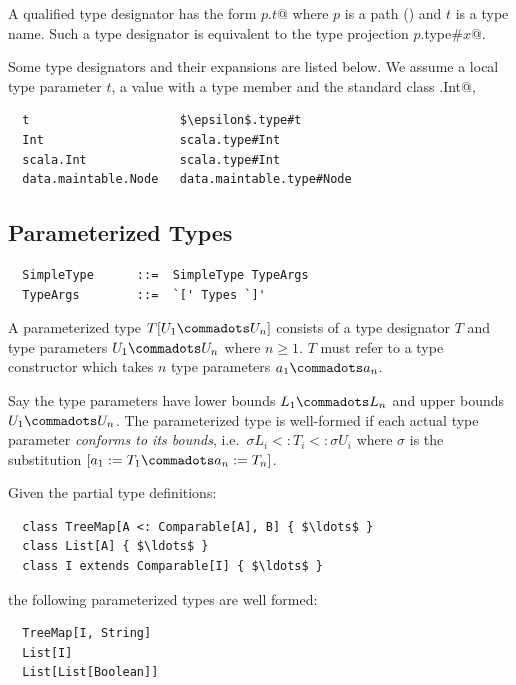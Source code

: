 A qualified type designator has the form \lstinline@$p$.$t$@ where $p$ is
a path () and $t$ is a type name. Such a type designator is
equivalent to the type projection \lstinline@$p$.type#$x$@.

\example 
Some type designators and their expansions are listed below. We assume
a local type parameter $t$, a value 
with a type member  and the standard class \lstinline@scala.Int@, 
\begin{lstlisting}
  t                     $\epsilon$.type#t
  Int                   scala.type#Int
  scala.Int             scala.type#Int
  data.maintable.Node   data.maintable.type#Node
\end{lstlisting}

\subsection{Parameterized Types}
\label{sec:param-types}

\syntax\begin{lstlisting}
  SimpleType      ::=  SimpleType TypeArgs
  TypeArgs        ::=  `[' Types `]'
\end{lstlisting}

A parameterized type $T[U_1 \commadots U_n]$ consists of a type
designator $T$ and type parameters $U_1 \commadots U_n$ where $n \geq
1$.  $T$ must refer to a type constructor which takes $n$ type
parameters $a_1 \commadots a_n$.

Say the type parameters have lower bounds $L_1 \commadots L_n$ and
upper bounds $U_1 \commadots U_n$.  The parameterized type is
well-formed if each actual type parameter {\em conforms to its
bounds}, i.e.\ $\sigma L_i <: T_i <: \sigma U_i$ where $\sigma$ is the
substitution $[a_1 := T_1 \commadots a_n := T_n]$.

\example\label{ex:param-types}
Given the partial type definitions:

\begin{lstlisting}
  class TreeMap[A <: Comparable[A], B] { $\ldots$ }
  class List[A] { $\ldots$ }
  class I extends Comparable[I] { $\ldots$ }
\end{lstlisting}

the following parameterized types are well formed:

\begin{lstlisting}
  TreeMap[I, String]
  List[I]
  List[List[Boolean]]
\end{lstlisting}

